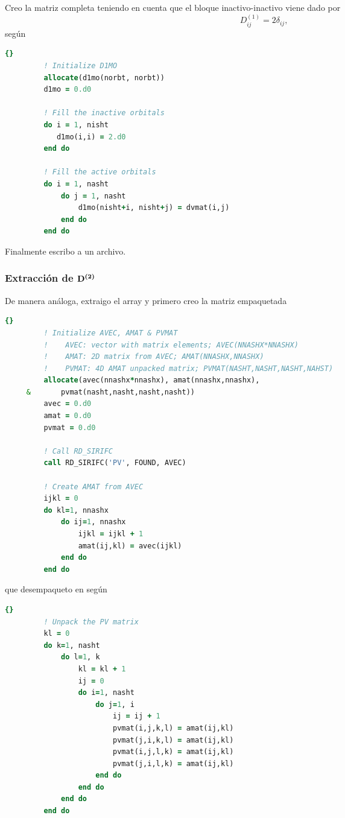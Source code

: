 Creo la matriz completa teniendo en cuenta que el bloque inactivo-inactivo
viene dado por 
\begin{equation}
         D^{(1)}_{ij} = 2\delta_{ij},
\end{equation}
según
\begin{lstlisting}[language=fortran]{}
         ! Initialize D1MO
         allocate(d1mo(norbt, norbt))
         d1mo = 0.d0

         ! Fill the inactive orbitals
         do i = 1, nisht
            d1mo(i,i) = 2.d0
         end do

         ! Fill the active orbitals
         do i = 1, nasht
             do j = 1, nasht
                 d1mo(nisht+i, nisht+j) = dvmat(i,j)
             end do
         end do
\end{lstlisting}
Finalmente escribo  a un archivo.

\subsubsection{Extracción de $\boldsymbol{\mathrm{D^{(2)}}}$} %
De manera análoga, extraigo el array  y primero creo la matriz
empaquetada 

\begin{lstlisting}[language=fortran]{}
         ! Initialize AVEC, AMAT & PVMAT
         !    AVEC: vector with matrix elements; AVEC(NNASHX*NNASHX)
         !    AMAT: 2D matrix from AVEC; AMAT(NNASHX,NNASHX)
         !    PVMAT: 4D AMAT unpacked matrix; PVMAT(NASHT,NASHT,NASHT,NAHST)
         allocate(avec(nnashx*nnashx), amat(nnashx,nnashx),
     &       pvmat(nasht,nasht,nasht,nasht))
         avec = 0.d0
         amat = 0.d0
         pvmat = 0.d0

         ! Call RD_SIRIFC
         call RD_SIRIFC('PV', FOUND, AVEC)

         ! Create AMAT from AVEC
         ijkl = 0
         do kl=1, nnashx
             do ij=1, nnashx
                 ijkl = ijkl + 1
                 amat(ij,kl) = avec(ijkl)
             end do
         end do
\end{lstlisting}
que desempaqueto en  según
\begin{lstlisting}[language=fortran]{}
         ! Unpack the PV matrix
         kl = 0
         do k=1, nasht
             do l=1, k
                 kl = kl + 1
                 ij = 0
                 do i=1, nasht
                     do j=1, i
                         ij = ij + 1
                         pvmat(i,j,k,l) = amat(ij,kl)
                         pvmat(j,i,k,l) = amat(ij,kl)
                         pvmat(i,j,l,k) = amat(ij,kl)
                         pvmat(j,i,l,k) = amat(ij,kl)
                     end do
                 end do
             end do
         end do
\end{lstlisting}

